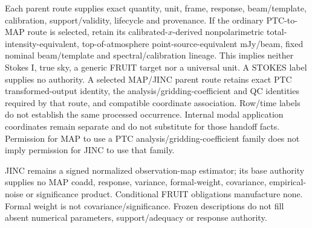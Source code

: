 {{Each parent route supplies exact quantity, unit, frame, response, beam/template,
calibration, support/validity, lifecycle and provenance. If the ordinary
PTC-to-MAP route is selected, retain its calibrated-$x$-derived nonpolarimetric
total-intensity-equivalent, top-of-atmosphere point-source-equivalent mJy/beam,
fixed nominal beam/template and spectral/calibration lineage. This implies
neither Stokes I, true sky, a generic FRUIT target nor a universal unit.
A STOKES label supplies no authority. A selected MAP/JINC parent route retains
exact PTC transformed-output identity, the analysis/gridding-coefficient and QC
identities required by that route, and compatible coordinate association.
Row/time labels do not establish the same processed occurrence. Internal modal
application coordinates remain separate and do not substitute for those
handoff facts. Permission for MAP to use a PTC analysis/gridding-coefficient
family does not imply permission for JINC to use that family.

JINC remains a signed normalized observation-map estimator; its base authority
supplies no MAP coadd, response, variance, formal-weight, covariance, empirical-
noise or significance product. Conditional FRUIT obligations manufacture none.
Formal weight is not covariance/significance. Frozen descriptions do not fill
absent numerical parameters, support/adequacy or response authority.
}}
